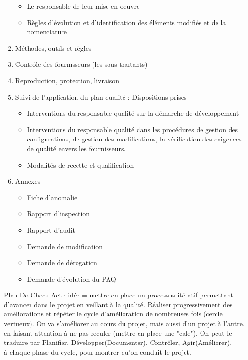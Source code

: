 \begin{enumerate}
\begin{itemize}
		\item Le responsable de leur mise en oeuvre
		\item Règles d'évolution et d'identification des éléments modifiés et de la nomenclature
	\end{itemize}
	\item Méthodes, outils et règles
	\item Contrôle des fournisseurs (les sous traitants)
	\item Reproduction, protection, livraison
	\item Suivi de l'application du plan qualité : Dispositions prises
	\begin{itemize}
		\item Interventions du responsable qualité sur la démarche de développement
		\item Interventions du responsable qualité dans les procédures de gestion des configurations, de gestion des modifications, la vérification des exigences de qualité envers les fournisseurs.
		\item Modalités de recette et qualification
	\end{itemize}
	\item Annexes
	\begin{itemize}
		\item Fiche d'anomalie
		\item Rapport d'inspection
		\item Rapport d'audit
		\item Demande de modification
		\item Demande de dérogation
		\item Demande d'évolution du PAQ
	\end{itemize}
\end{enumerate}

 Plan Do Check Act : idée = mettre en place un processus itératif permettant d'avancer dans le projet en veillant à la qualité. Réaliser progressivement des améliorations et répéter le cycle d'amélioration de nombreuses fois (cercle vertueux). On va s'améliorer au cours du projet, mais aussi d'un projet à l'autre.\\

 en faisant attention à ne pas reculer (mettre en place une "cale"). On peut le traduire par Planifier, Développer(Documenter), Contrôler, Agir(Améliorer). \\

 à chaque phase du cycle, pour montrer qu'on conduit le projet.\\


